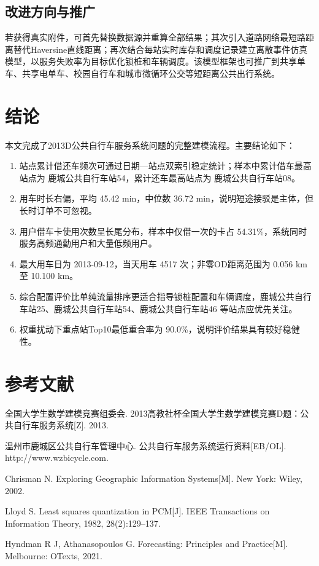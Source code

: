 \documentclass[UTF8,a4paper,12pt]{ctexart}
\begin{document}
\subsection{改进方向与推广}
若获得真实附件，可首先替换数据源并重算全部结果；其次引入道路网络最短路距离替代Haversine直线距离；再次结合每站实时库存和调度记录建立离散事件仿真模型，以服务失败率为目标优化锁桩和车辆调度。该模型框架也可推广到共享单车、共享电单车、校园自行车和城市微循环公交等短距离公共出行系统。

\section{结论}
本文完成了2013D公共自行车服务系统问题的完整建模流程。主要结论如下：
\begin{enumerate}[itemsep=0.35em]
  \item 站点累计借还车频次可通过日期—站点双索引稳定统计；样本中累计借车最高站点为 鹿城公共自行车站54，累计还车最高站点为 鹿城公共自行车站08。
  \item 用车时长右偏，平均 45.42 min，中位数 36.72 min，说明短途接驳是主体，但长时订单不可忽视。
  \item 用户借车卡使用次数呈长尾分布，样本中仅借一次的卡占 54.31\%，系统同时服务高频通勤用户和大量低频用户。
  \item 最大用车日为 2013-09-12，当天用车 4517 次；非零OD距离范围为 0.056 km至 10.100 km。
  \item 综合配置评价比单纯流量排序更适合指导锁桩配置和车辆调度，鹿城公共自行车站25、鹿城公共自行车站54、鹿城公共自行车站46 等站点应优先关注。
  \item 权重扰动下重点站Top10最低重合率为 90.0\%，说明评价结果具有较好稳健性。
\end{enumerate}

\section*{参考文献}
\begin{enumerate}[label={[\arabic*]}]
\item 全国大学生数学建模竞赛组委会. 2013高教社杯全国大学生数学建模竞赛D题：公共自行车服务系统[Z]. 2013.
\item 温州市鹿城区公共自行车管理中心. 公共自行车服务系统运行资料[EB/OL]. http://www.wzbicycle.com.
\item Chrisman N. Exploring Geographic Information Systems[M]. New York: Wiley, 2002.
\item Lloyd S. Least squares quantization in PCM[J]. IEEE Transactions on Information Theory, 1982, 28(2):129--137.
\item Hyndman R J, Athanasopoulos G. Forecasting: Principles and Practice[M]. Melbourne: OTexts, 2021.
\end{enumerate}
\end{document}

